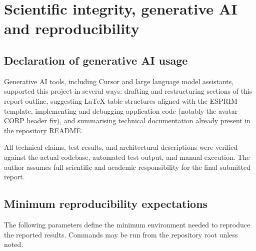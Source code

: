\chapter[AI Ethics]{Scientific integrity, generative AI and reproducibility}

\section{Declaration of generative AI usage}

Generative AI tools, including Cursor and large language model assistants, supported
this project in several ways: drafting and restructuring sections of this report
outline, suggesting LaTeX table structures aligned with the ESPRIM template,
implementing and debugging application code (notably the avatar CORP header fix),
and summarising technical documentation already present in the repository README.

All technical claims, test results, and architectural descriptions were verified
against the actual codebase, automated test output, and manual execution. The author
assumes full scientific and academic responsibility for the final submitted report.

\section{Minimum reproducibility expectations}

The following parameters define the minimum environment needed to reproduce the
reported results. Commands may be run from the repository root unless noted.

